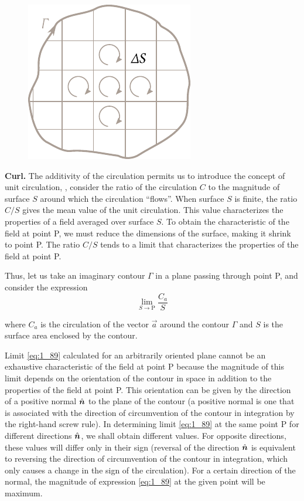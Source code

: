\begin{figure}[t]
	\begin{center}
		\includegraphics[scale=1]{figures/ch_01/fig_1_29.pdf}
		\caption[]{}
		\label{fig:1_29}
	\end{center}
	\vspace{-0.8cm}
\end{figure}

\textbf{Curl.} The additivity of the circulation permits us to introduce the concept of unit circulation, \ie, consider the ratio of the circulation $C$ to the magnitude of surface $S$ around which the circulation ``flows''. When surface $S$ is finite, the ratio $C/S$ gives the mean value of the unit circulation. This value characterizes the properties of a field averaged over surface $S$. To obtain the characteristic of the field at point P, we must reduce the dimensions of the surface, making it shrink to point P. The ratio $C/S$ tends to a limit that characterizes the properties of the field at point P.

Thus, let us take an imaginary contour $\Gamma$ in a plane passing through point P, and consider the expression
\begin{equation}\label{eq:1_89}
	\lim_{S\to\text{P}} \frac{C_a}{S}
\end{equation}

\noindent
where $C_a$ is the circulation of the vector $\vec{a}$ around the contour $\Gamma$ and $S$ is the surface area enclosed by the contour.

Limit \eqref{eq:1_89} calculated for an arbitrarily oriented plane cannot be an exhaustive characteristic of the field at point P because the magnitude of this limit depends on the orientation of the contour in space in addition to the properties of the field at point P. This orientation can be given by the direction of a positive normal $\hat{\boldsymbol{n}}$ to the plane of the contour (a positive normal is one that is associated with the direction of circumvention of the contour in integration by the right-hand screw rule). In determining limit \eqref{eq:1_89} at the same point P for different directions $\hat{\boldsymbol{n}}$, we shall obtain different values. For opposite directions, these values will differ only in their sign (reversal of the direction $\hat{\boldsymbol{n}}$ is equivalent to reversing the direction of circumvention of the contour in integration, which only causes a change in the sign of the circulation). For a certain direction of the normal, the magnitude of expression \eqref{eq:1_89} at the given point will be maximum.

